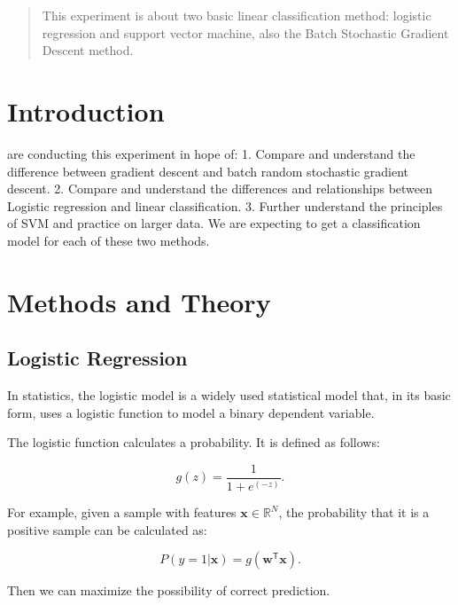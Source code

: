 \documentclass[journal, a4paper]{IEEEtran}
\begin{document}
\begin{abstract}
This experiment is about two basic linear classification method: logistic regression and support vector machine, also the Batch Stochastic Gradient Descent method.
\end{abstract}

\section{Introduction}
 are conducting this experiment in hope of: 1. Compare and understand the difference between gradient descent and batch random stochastic gradient descent. 2. Compare and understand the differences and relationships between Logistic regression and linear classification. 3. Further understand the principles of SVM and practice on larger data. We are expecting to get a classification model for each of these two methods.

\section{Methods and Theory}
\subsection{Logistic Regression}
In statistics, the logistic model is a widely used statistical model that, in its basic form, uses a logistic function to model a binary dependent variable.

The logistic function calculates a probability. It is defined as follows:

\begin{equation}
    g(z)=\frac{1}{1+e^(-z)}.
\end{equation}

For example, given a sample with features $\mathbf{x} \in \mathbb{R}^N$, the probability that it is a positive sample can be calculated as:

\begin{equation}
    P(y=1|\mathbf{x}) = g(\mathbf{w}^\mathsf{T}\mathbf{x}).
\end{equation}

Then we can maximize the possibility of correct prediction.
\end{document}
